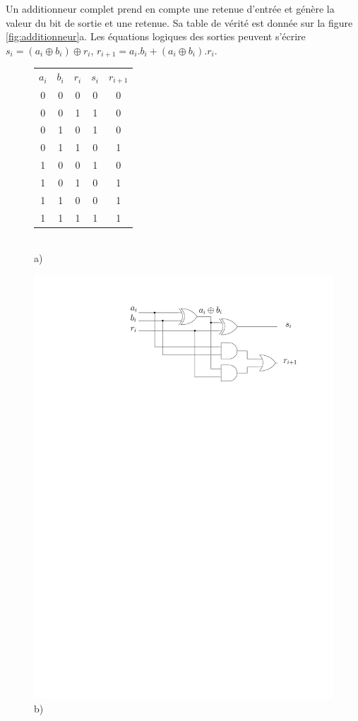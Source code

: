 Un additionneur complet prend en compte une retenue d'entrée et génère la valeur du bit de sortie et une retenue. Sa table de vérité est donnée sur la figure \ref{fig:additionneur}a. Les équations logiques des sorties peuvent s'écrire $s_i = (a_i \oplus b_i) \oplus r_i$, $r_{i+1} = a_i.b_i + (a_i \oplus b_i).r_i$.

\begin{figure}[htbp]
   \begin{minipage}[c]{.46\linewidth}
\begin{tabular}{ccc|cc}
$a_i$ & $b_i$ & $r_i$ & $s_i$ & $r_{i+1}$\\
0 & 0 & 0& 0 & 0\\
0 & 0 & 1& 1 & 0\\
0 & 1 & 0 & 1 & 0\\
0 & 1 & 1 & 0 & 1\\
1 & 0 & 0 & 1 & 0\\
1 & 0 & 1 & 0 & 1\\
1 & 1 & 0 & 0 & 1\\
1 & 1 & 1 & 1 & 1
\end{tabular}\\\centering a)
   \end{minipage} \hfill
   \begin{minipage}[c]{.46\linewidth}
\includegraphics[width=\columnwidth]{Figs/adder.pdf}\\\centering b)

\end{minipage}
\end{figure}
